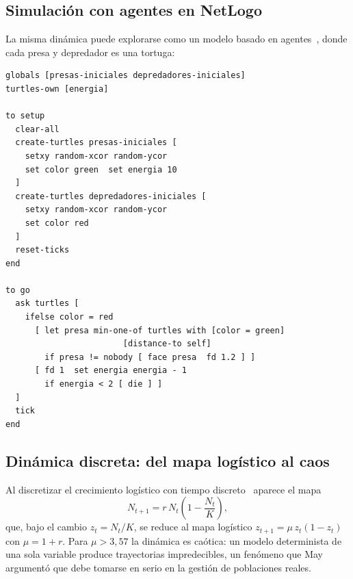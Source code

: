 \subsection{Simulación con agentes en NetLogo}

La misma dinámica puede explorarse como un modelo basado en
agentes~\cite{netlogo}, donde cada presa y depredador es una tortuga:

\begin{verbatim}
globals [presas-iniciales depredadores-iniciales]
turtles-own [energia]

to setup
  clear-all
  create-turtles presas-iniciales [
    setxy random-xcor random-ycor
    set color green  set energia 10
  ]
  create-turtles depredadores-iniciales [
    setxy random-xcor random-ycor
    set color red
  ]
  reset-ticks
end

to go
  ask turtles [
    ifelse color = red
      [ let presa min-one-of turtles with [color = green]
                        [distance-to self]
        if presa != nobody [ face presa  fd 1.2 ] ]
      [ fd 1  set energia energia - 1
        if energia < 2 [ die ] ]
  ]
  tick
end
\end{verbatim}

\subsection{Dinámica discreta: del mapa logístico al caos}

Al discretizar el crecimiento logístico con tiempo
discreto~\cite{may1976} aparece el mapa
\begin{equation}
  N_{t+1} = r\, N_t \left(1 - \frac{N_t}{K}\right),
  \label{eq:logistic-map}
\end{equation}
que, bajo el cambio $z_t = N_t/K$, se reduce al mapa logístico
$z_{t+1} = \mu\, z_t (1 - z_t)$ con $\mu = 1 + r$. Para $\mu > 3{,}57$
la dinámica es caótica: un modelo determinista de una sola variable
produce trayectorias impredecibles, un fenómeno que May argumentó que
debe tomarse en serio en la gestión de poblaciones reales.

\nocite{edelstein2007,tongqft}
\printbibliography[heading=bibintoc, title={Referencias}]
